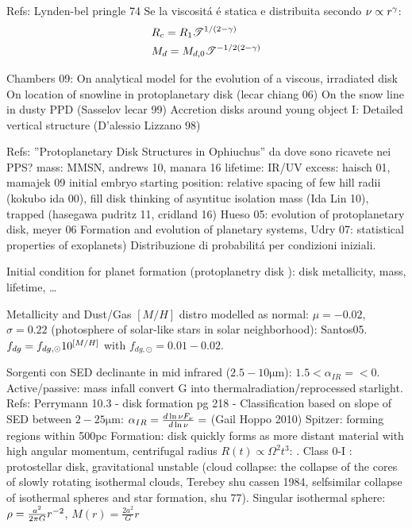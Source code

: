 \begin{workout}
	Refs: Lynden-bel pringle 74
	Se la viscosit\'a \'e statica e distribuita secondo $\nu\propto r^{\gamma}$:
	\begin{align}
		&R_c=R_1\mathcal{T}^{1/(2-\gamma)}\\
		&M_d=M_{d,0}\mathcal{T}^{-1/2(2-\gamma)}\\
	\end{align}
\end{workout}

\begin{workout}
	Chambers 09: On analytical model for the evolution of a viscous, irradiated disk
	On location of snowline in protoplanetary disk (lecar chiang 06)
	On the snow line in dusty PPD (Sasselov lecar 99)
	Accretion disks around young object I: Detailed vertical structure (D'alessio Lizzano 98)
\end{workout}

\begin{workout}
	Refs: ''Protoplanetary Disk Structures in Ophiuchus''
	da dove sono ricavete nei PPS?
	mass: MMSN, andrews 10, manara 16
	lifetime: IR/UV excess: haisch 01, mamajek 09
	initial embryo starting position: relative spacing of few hill radii (kokubo ida 00), fill disk thinking of asyntituc isolation mass (Ida Lin 10), trapped (hasegawa pudritz 11, cridland 16)
	Hueso 05: evolution of protoplanetary disk, meyer 06 Formation and evolution of planetary systems, Udry 07: statistical properties of exoplanets)
	Distribuzione di probabilit\'a per condizioni iniziali.
	
	Initial condition for planet formation (protoplanetry disk \cite{meyer2006formation}): disk metallicity, mass, lifetime, \ldots
	
	{Metallicity and Dust/Gas}
	$[M/H]$ distro modelled as normal: $\mu=-0.02$, $\sigma=0.22$ (photosphere of solar-like stars in solar neighborhood): Santos05.
	$f_{dg}=f_{dg,\odot}10^{[M/H]}$ with $f_{dg,\odot}=0.01-0.02$.
\end{workout}

\begin{workout}
	Sorgenti con SED declinante in mid infrared ($2.5-10\si{\micro\meter}$): $1.5<\alpha_{IR}=<0$. Active/passive: mass infall convert G into thermalradiation/reprocessed starlight.
	Refs: Perrymann 10.3 - disk formation pg 218 - 
	Classification based on slope of SED between $2-25\si{\micro\meter}$: $\alpha_{IR}=\frac{d \ln{\nu F_{\nu}}}{d \ln{\nu}}=$ (Gail Hoppo 2010)
	Spitzer: forming regions within 500pc
	Formation: disk quickly forms as more distant material with high angular momentum, centrifugal radius $R(t)\propto\Omega^2 t^3$: . Class 0-I : protostellar disk, gravitational unstable (cloud collapse: the collapse of the cores of slowly rotating isothermal clouds, Terebey shu cassen 1984, selfsimilar collapse of isothermal spheres and star formation, shu 77). Singular isothermal sphere: $\rho=\frac{a^2}{2\pi G}r^{-2}$, $M(r)=\frac{2a^2}{G}r$
\end{workout}

